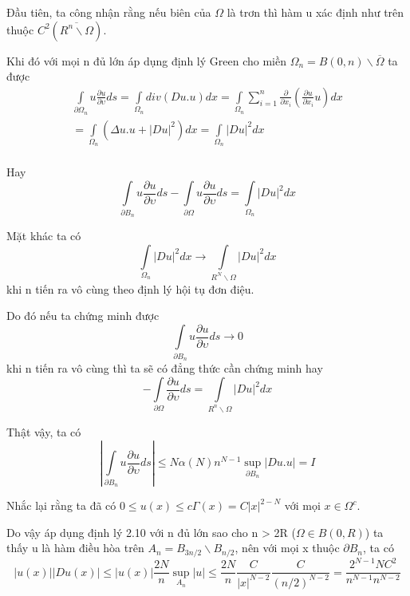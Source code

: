 Đầu tiên, ta công nhận rằng nếu biên của $\Omega$ là trơn thì hàm u xác định như trên thuộc $C^2 ( \overline{R^n \backslash \Omega}  )$.

Khi đó với mọi n đủ lớn áp dụng định lý Green cho miền $ \Omega_n = B(0,n) \backslash \overline{\Omega }$ ta được 
\[
\begin{array}{l}
 \int\limits_{\partial \Omega _n } {u\frac{{\partial u}}{{\partial \upsilon }}ds}  = \int\limits_{\Omega _n } {div(Du.u)dx}  = \int\limits_{\Omega _n } {\sum\limits_{i = 1}^n {\frac{\partial }{{\partial x_i }}\left( {\frac{{\partial u}}{{\partial x_i }}u} \right)} dx}  \\ 
  = \int\limits_{\Omega _n } {\left( {\Delta u.u + \left| {Du} \right|^2 } \right)dx}  = \int\limits_{\Omega _n } {\left| {Du} \right|^2 dx}  \\ 
 \end{array}
\] 

Hay \[
\int\limits_{\partial B_n } {u\frac{{\partial u}}{{\partial \upsilon }}ds}  - \int\limits_{\partial \Omega } {u\frac{{\partial u}}{{\partial \upsilon }}ds}  = \int\limits_{\Omega _n } {\left| {Du} \right|^2 dx} 
\] 

Mặt khác ta có \[
\int\limits_{\Omega _n } {\left| {Du} \right|^2 dx}  \to \int\limits_{R^N \backslash \Omega } {\left| {Du} \right|^2 dx} 
\]
khi n tiến ra vô cùng theo định lý hội tụ đơn điệu.

Do đó nếu ta chứng minh được
\[
\int\limits_{\partial B_n } {u\frac{{\partial u}}{{\partial \upsilon }}ds}  \to 0
\]
khi n tiến ra vô cùng thì ta sẽ có đẳng thức cần chứng minh hay \[
 - \int\limits_{\partial \Omega } {\frac{{\partial u}}{{\partial \upsilon }}} ds = \int\limits_{R^n \backslash \Omega } {|Du|^2 dx} 
\] 

Thật vậy, ta có \[
\left| {\int\limits_{\partial B_n } {u\frac{{\partial u}}{{\partial \upsilon }}ds} } \right| \le N\alpha (N)n^{N - 1} \mathop {\sup }\limits_{\partial B_n } \left| {Du.u} \right| = I
\]

Nhắc lại rằng ta đã có $0 \le u(x) \le c\Gamma (x) = C|x|^{2 - N} $ với mọi $ x \in \Omega^c$.

 Do vậy áp dụng định lý 2.10 với n đủ lớn sao cho n > 2R ($ \Omega \in B(0, R) $) ta thấy u là hàm điều hòa trên $A_n = B_{3n/2} \backslash B_{n/2}$, nên với mọi x thuộc $ \partial B_n$, ta có 
\[
|u(x)|\left| {Du(x)} \right| \le |u(x)|\frac{{2N}}{n}\mathop {\sup }\limits_{A_n } \left| u \right| \le \frac{{2N}}{n}\frac{C}{{\left| x \right|^{N - 2} }}\frac{C}{{(n/2)^{N - 2} }} = \frac{{2^{N - 1} NC^2 }}{{n^{N - 1} n^{N - 2} }}
\]

